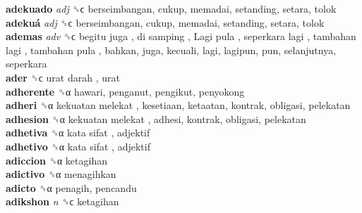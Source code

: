 \textbf{adekuado} \emph{adj}  ␝ϲ  berseimbangan, cukup, memadai, setanding, setara, tolok  \\
\textbf{adekuá} \emph{adj}  ␝ϲ  berseimbangan, cukup, memadai, setanding, setara, tolok  \\
\textbf{ademas} \emph{adv}  ␝ϲ   begitu juga ,  di samping ,  Lagi pula ,  seperkara lagi ,  tambahan lagi ,  tambahan pula , bahkan, juga, kecuali, lagi, lagipun, pun, selanjutnya, seperkara  \\
\textbf{ader} ␝ϲ   urat darah , urat  \\
\textbf{adherente} ␝α  hawari, penganut, pengikut, penyokong  \\
\textbf{adheri} ␝α   kekuatan melekat , kesetiaan, ketaatan, kontrak, obligasi, pelekatan  \\
\textbf{adhesion} ␝α   kekuatan melekat , adhesi, kontrak, obligasi, pelekatan  \\
\textbf{adhetiva} ␝α   kata sifat , adjektif  \\
\textbf{adhetivo} ␝α   kata sifat , adjektif  \\
\textbf{adiccion} ␝α  ketagihan  \\
\textbf{adictivo} ␝α  menagihkan  \\
\textbf{adicto} ␝α  penagih, pencandu  \\
\textbf{adikshon} \emph{n}  ␝ϲ  ketagihan  \\
